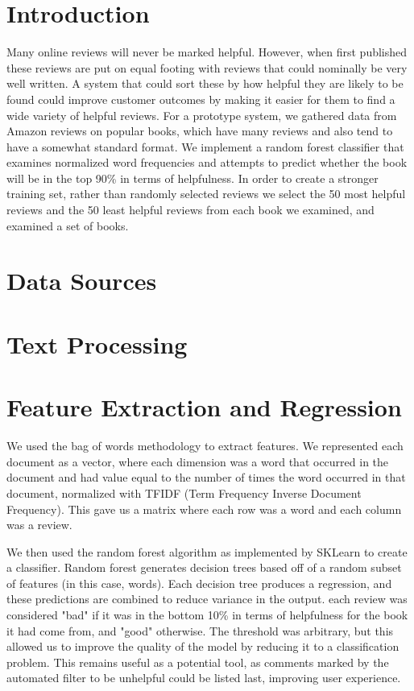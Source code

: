 \documentclass[]{article}
\begin{document}
\begin{multicols}{2}
\section{Introduction}
	Many online reviews will never be marked helpful. However, when first published these reviews are put on equal footing with reviews that could nominally be very well written. A system that could sort these by how helpful they are likely to be found could improve customer outcomes by making it easier for them to find a wide variety of helpful reviews. For a prototype system, we gathered data from Amazon reviews on popular books, which have many reviews and also tend to have a somewhat standard format. We implement a random forest classifier that examines normalized word frequencies and attempts to predict whether the book will be in the top 90\% in terms of helpfulness. In order to create a stronger training set, rather than randomly selected reviews we select the 50 most helpful reviews and the 50 least helpful reviews from each book we examined, and examined a set of %
	books.

\section{Data Sources}

\section{Text Processing}

\section{Feature Extraction and Regression}

We used the bag of words methodology to extract features. We represented each document as a vector, where each dimension was a word that occurred in the document and had value equal to the number of times the word occurred in that document, normalized with TFIDF (Term Frequency Inverse Document Frequency). This gave us a matrix where each row was a word and each column was a review.

We then used the random forest algorithm as implemented by SKLearn to create a classifier. Random forest generates decision trees based off of a random subset of features (in this case, words). Each decision tree produces a regression, and these predictions are combined to reduce variance in the output. each review was considered "bad" if it was in the bottom 10\% in terms of helpfulness for the book it had come from, and "good" otherwise. The threshold was arbitrary, but this allowed us to improve the quality of the model by reducing it to a classification problem. This remains useful as a potential tool, as comments marked by the automated filter to be unhelpful could be listed last, improving user experience.


\end{multicols}
\end{document}
